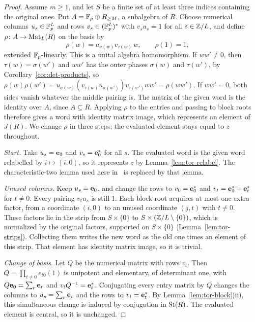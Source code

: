 \begin{proof}
Assume $m\geq1$, and let $S$ be a finite set of at least three indices containing the original ones. Put $A=\mathbb F_p\oplus R_{\geq M}$, a
subalgebra of $R$. Choose numerical columns $u_s\in\mathbb F_p^L$ and rows $v_s\in(\mathbb F_p^L)^*$ with $v_su_s=1$ for all
$s\in\mathbb Z/L$, and define $\rho\colon A\to\operatorname{Mat}_L(R)$ on the basis by
\[
 \rho(w)=u_{\sigma(w)}v_{\tau(w)}\,w,\qquad\rho(1)=1,
\]
extended $\mathbb F_p$-linearly. This is a unital algebra homomorphism. If $ww'\neq0$, then $\tau(w)=\sigma(w')$ and $ww'$ has
the outer phases $\sigma(w)$ and $\tau(w')$, by Corollary~\ref{cor:det-products}, so
$\rho(w)\rho(w')=u_{\sigma(w)}(v_{\tau(w)}u_{\sigma(w')})v_{\tau(w')}ww'=\rho(ww')$. If $ww'=0$, both sides vanish
whatever the middle pairing is. The matrix of the given word is the identity over $A$, since $A\subseteq R$. Applying
$\rho$ to the entries and passing to block roots therefore gives a word with identity matrix image, which represents an
element of $J(R)$. We change $\rho$ in three steps; the evaluated element stays equal to $z$ throughout.

\emph{Start.} Take $u_s=\mathbf e_0$ and $v_s=\mathbf e_0^*$ for all $s$. The evaluated word is the given word relabelled by
$i\mapsto(i,0)$, so it represents $z$ by Lemma~\ref{lem:tor-relabel}. The characteristic-two lemma used here
in~\cite{OAI247rf} is replaced by that lemma.

\emph{Unused columns.} Keep $u_s=\mathbf e_0$, and change the rows to $v_0=\mathbf e_0^*$ and $v_t=\mathbf e_0^*+\mathbf e_t^*$ for
$t\neq0$. Every pairing $v_tu_s$ is still $1$. Each block root acquires at most one extra factor, from a coordinate
$(i,0)$ to an unused coordinate $(j,t)$ with $t\neq0$. These factors lie in the strip from $S\times\{0\}$ to
$S\times(\mathbb Z/L\setminus\{0\})$, which is normalized by the original factors, supported on $S\times\{0\}$
(Lemma~\ref{lem:tor-strips}). Collecting them writes the new word as the old one times an element of this strip. That
element has identity matrix image, so it is trivial.

\emph{Change of basis.} Let $Q$ be the numerical matrix with rows $v_t$. Then $Q=\prod_{t\neq0}e_{t0}(1)$ is unipotent
and elementary, of determinant one, with $Q\mathbf e_0=\sum_r\mathbf e_r$ and $v_tQ^{-1}=\mathbf e_t^*$. Conjugating every entry
matrix by $Q$ changes the columns to $u_s=\sum_r\mathbf e_r$ and the rows to $v_t=\mathbf e_t^*$. By
Lemma~\ref{lem:tor-block}(ii), this simultaneous change is induced by conjugation in $\operatorname{St}(R)$. The evaluated element is
central, so it is unchanged.


\end{proof}

